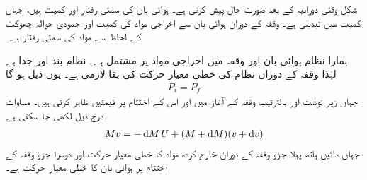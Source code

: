شکل   وقتی دورانیہ  کے بعد صورت حال پیش کرتی ہے۔ ہوائی بان کی سمتی رفتار  اور کمیت  ہیں، جہاں کمیت میں تبدیلی  ہے۔ وقفہ  کے دوران ہوائی بان سے  اخراجی مواد کی کمیت   اور جمودی  حوالہ چھوکٹ کے لحاظ  سے    مواد کی سمتی  رفتار  ہے۔

ہمارا  نظام  ہوائی بان اور وقفہ  میں اخراجی مواد پر مشتمل ہے۔ نظام بند اور  جدا ہے لہٰذا وقفہ  کے دوران نظام کی خطی معیار حرکت کی بقا لازمی ہے۔ یوں ذیل ہو گا
\begin{align}\label{مساوات_مرکز_کمیت_معیار_بقا_لازمی}
P_i=P_f
\end{align}
جہاں زیر نوشت   اور  بالترتیب  وقفہ   کے آغاز میں اور  اس کے اختتام پر قیمتیں ظاہر کرتی ہیں۔ مساوات  درج ذیل لکھی جا سکتی ہے
\begin{align}\label{مساوات_مرکز_کمیت_وقفہ_کے_دوران}
Mv=-\dif M \,U+(M+\dif M)(v+\dif v)
\end{align}
جہاں دائیں ہاتھ پہلا جزو وقفہ   کے دوران خارج کردہ مواد کا  خطی معیار حرکت اور  دوسرا جزو وقفہ   کے اختتام  پر ہوائی بان کا خطی معیار حرکت  ہے۔

